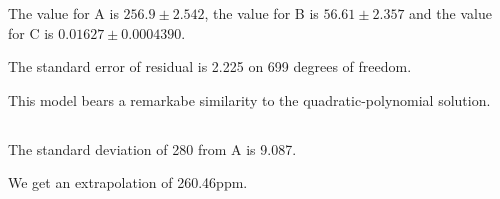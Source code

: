 \documentclass[paper=a4, fontsize=11pt]{scrartcl}
\numberwithin{equation}{section} %
\numberwithin{figure}{section} %
\numberwithin{table}{section} %
\begin{document}
The value for A is $256.9\pm2.542$, the value for B is $56.61\pm2.357$ and the value for C is $0.01627\pm0.0004390$.

The standard error of residual is 2.225 on 699 degrees of freedom.

This model bears a remarkabe similarity to the quadratic-polynomial solution.

\subsection{}
The standard deviation of 280 from A is 9.087.

We get an extrapolation of 260.46ppm.
\end{document}
